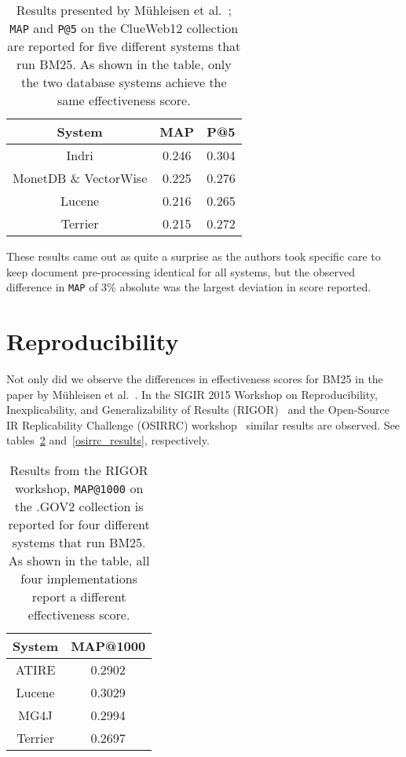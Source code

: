 \begin{table}
	\centering
	\caption{Results presented by M\"{u}hleisen et al.~\cite{OldDog}; \texttt{MAP} and \texttt{P@5} on the ClueWeb12 collection are reported for five different systems that run BM25. As shown in the table, only the two database systems achieve the same effectiveness score.}
	\label{olddog_results}
	\begin{tabular}{c c c}
		\toprule
		System &  MAP & P@5 \\
		\midrule
		Indri & 0.246 & 0.304 \\
		MonetDB \& VectorWise & 0.225 & 0.276 \\
		Lucene & 0.216 & 0.265 \\
		Terrier & 0.215 & 0.272 \\
		\bottomrule
	\end{tabular}
\end{table}

These results came out as quite a surprise as the authors took specific care to keep document pre-processing identical for all systems, but the observed difference in \texttt{MAP} of 3\% absolute was the largest deviation in score reported.


\section{Reproducibility}
Not only did we observe the differences in effectiveness scores for BM25 in the paper by M\"{u}hleisen et al.~\cite{OldDog}. In the SIGIR 2015 Workshop on Reproducibility, Inexplicability, and Generalizability of Results (RIGOR)~\cite{RIGOR} and the Open-Source IR Replicability Challenge (OSIRRC) workshop~\cite{OSIRRC} similar results are observed. See tables~\ref{rigor_results} and~\ref{osirrc_results}, respectively.  

\begin{table}
	\centering
	\caption{Results from the RIGOR workshop\cite{RIGOR}, \texttt{MAP@1000} on the .GOV2 collection is reported for four different systems that run BM25. As shown in the table, all four implementations report a different effectiveness score.}
	\label{rigor_results}
	\begin{tabular}{c c}
		\toprule
		System &  MAP@1000 \\
		\midrule
		ATIRE & 0.2902 \\
		Lucene & 0.3029 \\
		MG4J & 0.2994 \\
		Terrier & 0.2697 \\
		\bottomrule
	\end{tabular}
\end{table}


